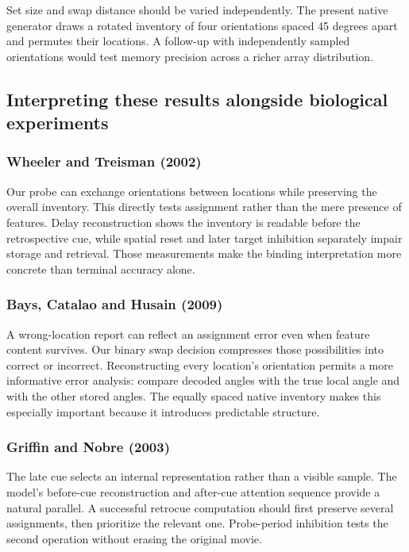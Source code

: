 \documentclass[11pt]{article}
\begin{document}
Set size and swap distance should be varied independently. The present native generator draws a rotated inventory of four orientations spaced 45 degrees apart and permutes their locations. A follow-up with independently sampled orientations would test memory precision across a richer array distribution.

\subsection{Interpreting these results alongside biological experiments}
\subsubsection{Wheeler and Treisman (2002)}
Our probe can exchange orientations between locations while preserving the overall inventory. This directly tests assignment rather than the mere presence of features. Delay reconstruction shows the inventory is readable before the retrospective cue, while spatial reset and later target inhibition separately impair storage and retrieval. Those measurements make the binding interpretation more concrete than terminal accuracy alone. \cite{bio_wheeler}

\subsubsection{Bays, Catalao and Husain (2009)}
A wrong-location report can reflect an assignment error even when feature content survives. Our binary swap decision compresses those possibilities into correct or incorrect. Reconstructing every location’s orientation permits a more informative error analysis: compare decoded angles with the true local angle and with the other stored angles. The equally spaced native inventory makes this especially important because it introduces predictable structure. \cite{bio_bays}

\subsubsection{Griffin and Nobre (2003)}
The late cue selects an internal representation rather than a visible sample. The model’s before-cue reconstruction and after-cue attention sequence provide a natural parallel. A successful retrocue computation should first preserve several assignments, then prioritize the relevant one. Probe-period inhibition tests the second operation without erasing the original movie. \cite{bio_griffin}
\end{document}
